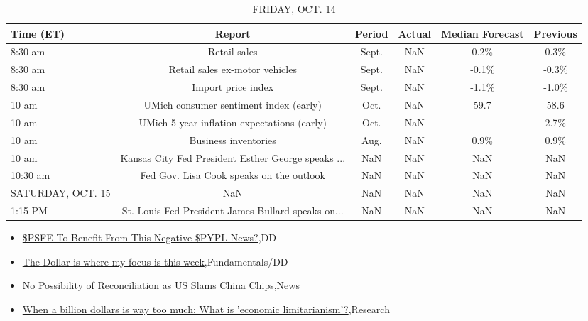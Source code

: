 \documentclass{article}%
\begin{document}
%


\begin{table}[htbp]%
\caption{FRIDAY, OCT. 14}%
\centering%
\begin{adjustbox}{width=1\textwidth}%
\begin{tabular}{lccccc}
\toprule
        Time (ET) &                                             Report & Period & Actual & Median Forecast & Previous \\
\midrule
          8:30 am &                                       Retail sales &  Sept. &    NaN &            0.2\% &     0.3\% \\
          8:30 am &                     Retail sales ex-motor vehicles &  Sept. &    NaN &           -0.1\% &    -0.3\% \\
          8:30 am &                                 Import price index &  Sept. &    NaN &           -1.1\% &    -1.0\% \\
            10 am &             UMich consumer sentiment index (early) &   Oct. &    NaN &            59.7 &     58.6 \\
            10 am &        UMich 5-year inflation expectations (early) &   Oct. &    NaN &              -- &     2.7\% \\
            10 am &                               Business inventories &   Aug. &    NaN &            0.9\% &     0.9\% \\
            10 am & Kansas City Fed President Esther George speaks ... &    NaN &    NaN &             NaN &      NaN \\
         10:30 am &           Fed Gov. Lisa Cook speaks on the outlook &    NaN &    NaN &             NaN &      NaN \\
SATURDAY, OCT. 15 &                                                NaN &    NaN &    NaN &             NaN &      NaN \\
          1:15 PM & St. Louis Fed President James Bullard speaks on... &    NaN &    NaN &             NaN &      NaN \\
\bottomrule
\end{tabular}
%
\end{adjustbox}%
\end{table}

%
\begin{itemize}%
\item%
\href{https://reddit.com/r/wallstreetbets/comments/y0dhli/psfe\_to\_benefit\_from\_this\_negative\_pypl\_news/}{\$PSFE To Benefit From This Negative \$PYPL News?},DD%
\item%
\href{https://reddit.com/r/StockMarket/comments/y09ww8/the\_dollar\_is\_where\_my\_focus\_is\_this\_week/}{The Dollar is where my focus is this week},Fundamentals/DD%
\item%
\href{https://reddit.com/r/Economics/comments/y0ci74/no\_possibility\_of\_reconciliation\_as\_us\_slams/}{No Possibility of Reconciliation as US Slams China Chips},News%
\item%
\href{https://reddit.com/r/Economics/comments/y0caho/when\_a\_billion\_dollars\_is\_way\_too\_much\_what\_is/}{When a billion dollars is way too much: What is 'economic limitarianism'?},Research%
\end{itemize}%
\end{document}
